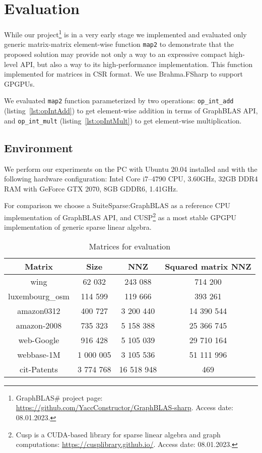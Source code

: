 \section{Evaluation}

While our project\footnote{GraphBLAS\# project page: \url{https://github.com/YaccConstructor/GraphBLAS-sharp}. Access date: 08.01.2023.} is in a very early stage we implemented and evaluated only generic matrix-matrix element-wise function \texttt{map2} to demonstrate that the proposed solution may provide not only a way to an expressive compact high-level API, but also a way to its high-performance implementation. This function implemented for matrices in CSR format. We use Brahma.FSharp to support GPGPUs.  

We evaluated \texttt{map2} function parameterized by two operations: \texttt{op\_int\_add} (listing~\ref{lst:opIntAdd}) to get element-wise addition in terms of GraphBLAS API, and \texttt{op\_int\_mult} (listing~\ref{lst:opIntMult}) to get element-wise multiplication.

\subsection{Environment}
We perform our experiments on the PC with Ubuntu 20.04 installed and with the following hardware configuration: Intel Core i7--4790 CPU, 3.60GHz, 32GB DDR4 RAM with GeForce GTX 2070, 8GB GDDR6, 1.41GHz.

For comparison we choose a SuiteSparse:GraphBLAS as a reference CPU implementation of GraphBLAS API, and CUSP\footnote{Cusp is a CUDA-based library for sparse linear algebra and graph computations: \url{https://cusplibrary.github.io/}. Access date: 08.01.2023.} as a most stable GPGPU implementation of generic sparse linear algebra.

\begin{table}[H]
    \centering
    \caption{Matrices for evaluation}
    \label{matrices}  
    \begin{tabular}{ | c || c | c | c | }
    \hline
    Matrix & Size & NNZ & Squared matrix NNZ \\ \hline
    \hline
    wing & 62 032 & 243 088 & 714 200 \\ \hline
    luxembourg\_osm & 114 599 & 119 666 & 393 261 \\ \hline
    amazon0312 & 400 727 & 3 200 440 & 14 390 544 \\ \hline
    amazon-2008 & 735 323 & 5 158 388 & 25 366 745 \\ \hline
    web-Google & 916 428 & 5 105 039 & 29 710 164 \\ \hline
    webbase-1M & 1 000 005 & 3 105 536 & 51 111 996 \\ \hline
    cit-Patents & 3 774 768 & 16 518 948 & 469 \\ \hline
    \end{tabular}
\end{table}


